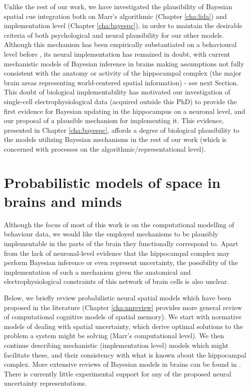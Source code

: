 Unlike the rest of our work, we have investigated the plausibility of Bayesian spatial cue integration both on Marr's algorithmic (Chapter \ref{cha:lida}) and implementation level (Chapter \ref{cha:bayespc}), in order to maintain the desirable criteria of both psychological and neural plausibility for our other models. Although this mechanism has been empirically substantiated on a behavioural level before \citep{cheng2007bayesian, nardini2008development}, its neural implementation has remained in doubt, with current mechanistic models of Bayesian inference in brains making assumptions not fully consistent with the anatomy or activity of the hippocampal complex (the major brain areas representing world-centered spatial information) - see next Section. This doubt of biological implementability has motivated our investigation of single-cell electrophysiological data (acquired outside this PhD) to provide the first evidence for Bayesian updating in the hippocampus on a neuronal level, and our proposal of a plausible mechanism for implementing it. This evidence, presented in Chapter \ref{cha:bayespc}, affords a degree of biological plausibility to the models utilizing Bayesian mechanisms in the rest of our work (which is concerned with processes on the algorithmic/representational level).


\section{Probabilistic models of space in brains and minds}
\label{sec:intro:uncertaintybrain} 

Although the focus of most of this work is on the computational modelling of behaviour data, we would like the employed mechanisms to be plausibly implementable in the parts of the brain they functionally correspond to. Apart from the lack of neuronal-level evidence that the hippocampal complex may perform Bayesian inference or even represent uncertainty, the possibility of the implementation of such a mechanism given the anatomical and electrophysiological constraints of this network of brain cells is also unclear. 

Below, we briefly review probabilistic neural spatial models which have been proposed in the literature (Chapter \ref{cha:nnreview} provides more general review of computational cognitive models of spatial memory). We start with normative models of dealing with spatial uncertainty, which derive optimal solutions to the problem a system might be solving (Marr's computational level). We then continue describing mechanistic (implementation level) models which might facilitate these, and their consistency with what is known about the hippocampal complex. More extensive reviews of Bayesian models in brains can be found in \citep{pouget2013probabilistic, vilares2011bayesian}. There is currently little experimental support for any of the proposed neural uncertainty representations. %

